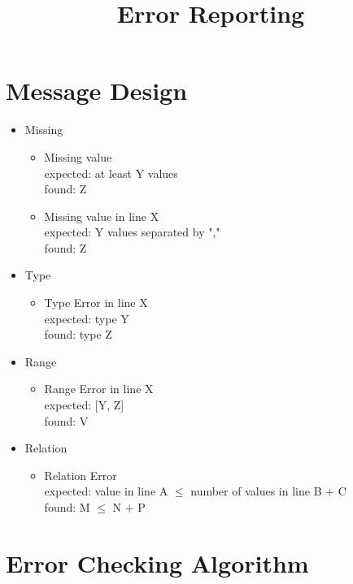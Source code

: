 \documentclass[11pt]{article}
\begin{document}
\title{Error Reporting}


\section{Message Design}

\begin{itemize}
    \item Missing
    \begin{itemize}
        \item Missing value\\
        expected: at least Y values\\
        found: Z
        \item Missing value in line X\\
        expected: Y values separated by ","\\
        found: Z
    \end{itemize}
    \item Type
    \begin{itemize}
        \item Type Error in line X\\
        expected: type Y\\
        found: type Z
    \end{itemize}
    \item Range
    \begin{itemize}
        \item Range Error in line X\\
        expected: [Y, Z]\\
        found: V
    \end{itemize}
    \item Relation
    \begin{itemize}
        \item Relation Error\\
        expected: value in line A $\leq$ number of values in line B + C\\
        found: M $\leq$ N + P
    \end{itemize}
\end{itemize}

\section{Error Checking Algorithm}
\end{document}
